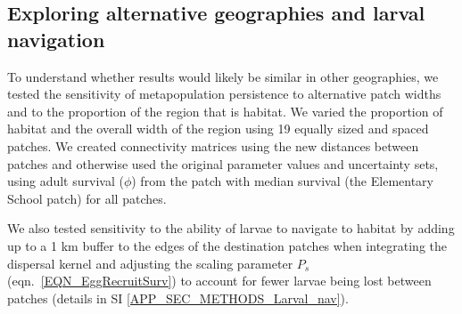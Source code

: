 \documentclass[12pt, oneside]{article}   	%
\begin{document}



\subsection*{Exploring alternative geographies and larval navigation}

To understand whether results would likely be similar in other geographies, we tested the sensitivity of metapopulation persistence to alternative patch widths and to the proportion of the region that is habitat. We varied the proportion of habitat and the overall width of the region using 19 equally sized and spaced patches. We created connectivity matrices using the new distances between patches and otherwise used the original parameter values and uncertainty sets, using adult survival ($\phi$) from the patch with median survival (the Elementary School patch) for all patches.

We also tested sensitivity to the ability of larvae to navigate to habitat by adding up to a 1 km buffer to the edges of the destination patches when integrating the dispersal kernel and adjusting the scaling parameter $P_s$ (eqn.\ \ref{EQN_EggRecruitSurv}) to account for fewer larvae being lost between patches (details in SI \ref{APP_SEC_METHODS_Larval_nav}).
\end{document}
